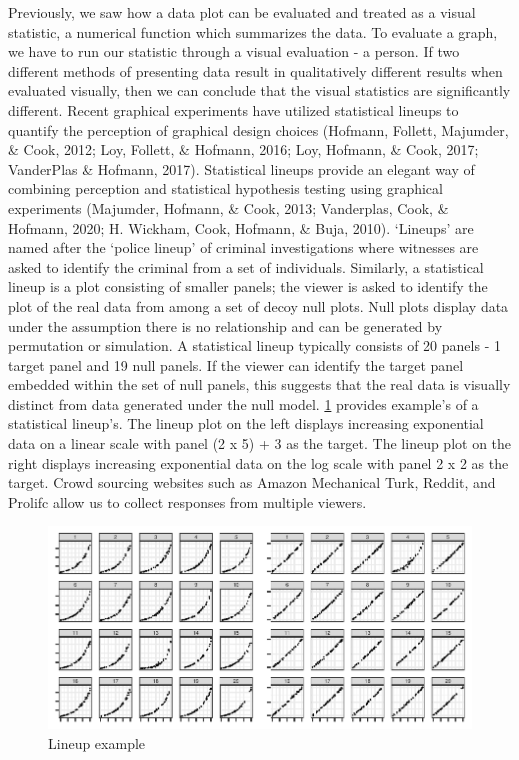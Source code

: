 \documentclass[print]{nuthesis}
\begin{document}
Previously, we saw how a data plot can be evaluated and treated as a visual statistic, a numerical function which summarizes the data.
To evaluate a graph, we have to run our statistic through a visual evaluation - a person.
If two different methods of presenting data result in qualitatively different results when evaluated visually, then we can conclude that the visual statistics are significantly different.
Recent graphical experiments have utilized statistical lineups to quantify the perception of graphical design choices (Hofmann, Follett, Majumder, \& Cook, 2012; Loy, Follett, \& Hofmann, 2016; Loy, Hofmann, \& Cook, 2017; VanderPlas \& Hofmann, 2017).
Statistical lineups provide an elegant way of combining perception and statistical hypothesis testing using graphical experiments (Majumder, Hofmann, \& Cook, 2013; Vanderplas, Cook, \& Hofmann, 2020; H. Wickham, Cook, Hofmann, \& Buja, 2010).
`Lineups' are named after the `police lineup' of criminal investigations where witnesses are asked to identify the criminal from a set of individuals.
Similarly, a statistical lineup is a plot consisting of smaller panels; the viewer is asked to identify the plot of the real data from among a set of decoy null plots.
Null plots display data under the assumption there is no relationship and can be generated by permutation or simulation.
A statistical lineup typically consists of 20 panels - 1 target panel and 19 null panels.
If the viewer can identify the target panel embedded within the set of null panels, this suggests that the real data is visually distinct from data generated under the null model.
\cref{fig:lineup-example} provides example's of a statistical lineup's.
The lineup plot on the left displays increasing exponential data on a linear scale with panel (2 x 5) + 3 as the target.
The lineup plot on the right displays increasing exponential data on the log scale with panel 2 x 2 as the
target.
Crowd sourcing websites such as Amazon Mechanical Turk, Reddit, and Prolifc allow us to collect responses from multiple viewers.

\begin{figure}[tbp]

{\centering \includegraphics[width=\linewidth,]{thesis_files/figure-latex/lineup-example-1} 

}

\caption{Lineup example}\label{fig:lineup-example}
\end{figure}
\end{document}
